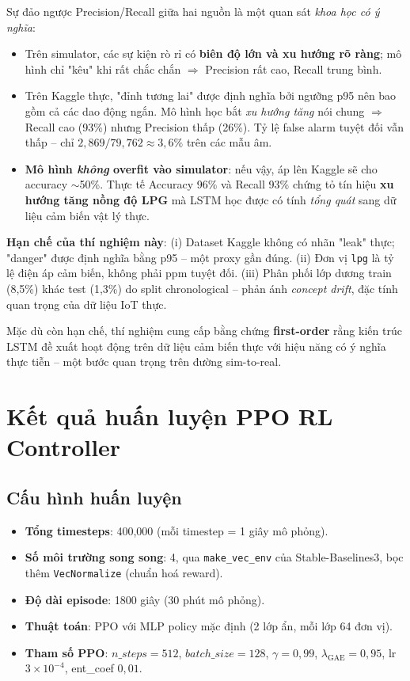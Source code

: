 Sự đảo ngược Precision/Recall giữa hai nguồn là một quan sát \emph{khoa học có ý nghĩa}:

\begin{itemize}
  \item Trên simulator, các sự kiện rò rỉ có \textbf{biên độ lớn và xu hướng rõ ràng}; mô hình chỉ "kêu" khi rất chắc chắn $\Rightarrow$ Precision rất cao, Recall trung bình.

  \item Trên Kaggle thực, "đỉnh tương lai" được định nghĩa bởi ngưỡng p95 nên bao gồm cả các dao động ngắn. Mô hình học bắt \emph{xu hướng tăng} nói chung $\Rightarrow$ Recall cao (93\%) nhưng Precision thấp (26\%). Tỷ lệ false alarm tuyệt đối vẫn thấp -- chỉ $2{,}869/79{,}762 \approx 3{,}6\%$ trên các mẫu âm.

  \item \textbf{Mô hình \emph{không} overfit vào simulator}: nếu vậy, áp lên Kaggle sẽ cho accuracy $\sim$50\%. Thực tế Accuracy 96\% và Recall 93\% chứng tỏ tín hiệu \textbf{xu hướng tăng nồng độ LPG} mà LSTM học được có tính \emph{tổng quát} sang dữ liệu cảm biến vật lý thực.
\end{itemize}

\textbf{Hạn chế của thí nghiệm này}: (i) Dataset Kaggle không có nhãn "leak" thực; "danger" được định nghĩa bằng p95 -- một proxy gần đúng. (ii) Đơn vị \texttt{lpg} là tỷ lệ điện áp cảm biến, không phải ppm tuyệt đối. (iii) Phân phối lớp dương train (8{,}5\%) khác test (1{,}3\%) do split chronological -- phản ánh \emph{concept drift}, đặc tính quan trọng của dữ liệu IoT thực.

Mặc dù còn hạn chế, thí nghiệm cung cấp bằng chứng \textbf{first-order} rằng kiến trúc LSTM đề xuất hoạt động trên dữ liệu cảm biến thực với hiệu năng có ý nghĩa thực tiễn -- một bước quan trọng trên đường sim-to-real.

\section{Kết quả huấn luyện PPO RL Controller}

\subsection{Cấu hình huấn luyện}

\begin{itemize}
  \item \textbf{Tổng timesteps}: 400{,}000 (mỗi timestep = 1 giây mô phỏng).
  \item \textbf{Số môi trường song song}: 4, qua \texttt{make\_vec\_env} của Stable-Baselines3, bọc thêm \texttt{VecNormalize} (chuẩn hoá reward).
  \item \textbf{Độ dài episode}: 1800 giây (30 phút mô phỏng).
  \item \textbf{Thuật toán}: PPO với MLP policy mặc định (2 lớp ẩn, mỗi lớp 64 đơn vị).
  \item \textbf{Tham số PPO}: $n\_steps=512$, $batch\_size=128$, $\gamma=0{,}99$, $\lambda_{\text{GAE}}=0{,}95$, lr $3\times10^{-4}$, ent\_coef $0{,}01$.
\end{itemize}

